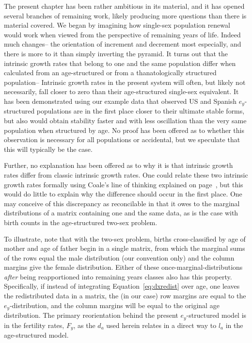 \FloatBarrier

The present chapter has been rather ambitious in its material, and it has opened
several branches of remaining work, likely producing more questions
than there is material covered. We began by imagining how single-sex population
renewal would work when viewed from the perspective of remaining years of life. 
Indeed much changes-- the orientation of increment and decrement most
especially, and there is more to it than simply inverting the pyramid. It turns
out that the intrinsic growth rates that belong to one and the same population 
differ when calculated from an age-structured or from a thanatologically 
structured population-- Intrinsic growth rates in the present
system will often, but likely not necessarily, fall closer to zero than their
age-structured single-sex equivalent. It has been demonstrated using our 
example data that observed US and Spanish $e_y$-structured populations
are in the first place closer to their ultimate stable forms, but also would 
obtain stability faster and with less oscillation
than the very same population when structured by age. No proof has been offered
as to whether this observation is necessary for all populations or accidental,
but we speculate that this will typically be the case. 

Further, no explanation
has been offered as to why it is that intrinsic growth rates differ from classic 
intrinsic growth rates. One could relate these two intrinsic growth
rates formally using Coale's line of thinking explained on
page~\pageref{par:coalermrf}, but this would do little to explain why the
difference should occur in the first place. One may conceive of this
discrepancy as reconcilable in that it owes to the marginal distributions
of a matrix containing one and the same data, as is the case with birth counts
in the age-structured two-sex problem. 

To illustrate, note that with the two-sex
problem, births cross-classified by age of mother and age of father begin 
in a single matrix, from which the marginal
sums of the rows equal the male distribution (our convention only) and the
column margins give the female distribution. Either of these
once-marginal-distributions \textit{after} being reapportioned into
remaining years classes also has this property. Specifically, if instead of
integrating Equation~\eqref{eq:dxredist} over age, one leaves the redistributed
data in a matrix, the (in our case) row margins are equal to the
$e_y$-distribution, and the column margins will be equal to the original age
distribution. The primary reorientation behind the present
$e_y$-structured model is in the fertility rates, $F_y$, as the $d_a$ used
herein relates in a direct way to $l_a$ in the age-structured model. 


